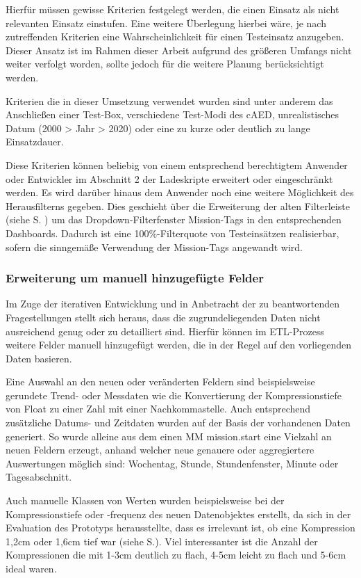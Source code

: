 Hierfür müssen gewisse Kriterien festgelegt werden, die einen Einsatz als nicht relevanten Einsatz einstufen.
Eine weitere Überlegung hierbei wäre, je nach zutreffenden Kriterien eine Wahrscheinlichkeit für einen Testeinsatz anzugeben.
Dieser Ansatz ist im Rahmen dieser Arbeit aufgrund des größeren Umfangs nicht weiter verfolgt worden, sollte jedoch für die weitere Planung berücksichtigt werden.

Kriterien die in dieser Umsetzung verwendet wurden sind unter anderem das Anschließen einer Test-Box, verschiedene Test-Modi des \gls{cAED}, unrealistisches Datum (2000 > Jahr > 2020) oder eine zu kurze oder deutlich zu lange Einsatzdauer.

Diese Kriterien können beliebig von einem entsprechend berechtigtem Anwender oder Entwickler im Abschnitt 2 der Ladeskripte erweitert oder eingeschränkt werden.
Es wird darüber hinaus dem Anwender noch eine weitere Möglichkeit des Herausfilterns gegeben.
Dies geschieht über die Erweiterung der alten Filterleiste (siehe S. \pageref{par:filter}) um das Dropdown-Filterfenster \glqq Mission-Tags\grqq{} in den entsprechenden Dashboards. %
Dadurch ist eine 100\%-Filterquote von Testeinsätzen realisierbar, sofern die sinngemäße Verwendung der Mission-Tags angewandt wird.

\subsubsection{Erweiterung um manuell hinzugefügte Felder}
\label{subsub:weitereFelder}
Im Zuge der iterativen Entwicklung und in Anbetracht der zu beantwortenden Fragestellungen stellt sich heraus, dass die zugrundeliegenden Daten nicht ausreichend genug oder zu detailliert sind.
Hierfür können im \gls{ETL}-Prozess weitere Felder manuell hinzugefügt werden, die in der Regel auf den vorliegenden Daten basieren.

Eine Auswahl an den neuen oder veränderten Feldern sind beispielsweise gerundete Trend- oder Messdaten wie die Konvertierung der Kompressionstiefe von \glqq Float\grqq{} zu einer Zahl mit einer Nachkommastelle.
Auch entsprechend zusätzliche Datums- und Zeitdaten wurden auf der Basis der vorhandenen Daten generiert. 
So wurde alleine aus dem einen \gls{MM} \glqq mission.start\grqq{} eine Vielzahl an neuen Feldern erzeugt, anhand welcher neue genauere oder aggregiertere Auswertungen möglich sind: Wochentag, Stunde, Stundenfenster, Minute oder Tagesabschnitt.

Auch manuelle Klassen von Werten wurden beispielsweise bei der Kompressionstiefe oder -frequenz des neuen Datenobjektes erstellt, da sich in der Evaluation des Prototyps herausstellte, dass es irrelevant ist, ob eine Kompression 1,2cm oder 1,6cm tief war (siehe S.\pageref{par:binning}).
Viel interessanter ist die Anzahl der Kompressionen die mit 1-3cm deutlich zu flach, 4-5cm leicht zu flach und 5-6cm ideal waren.

